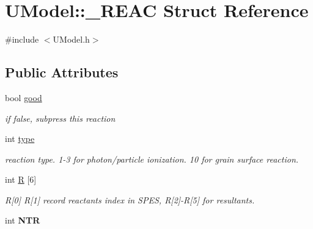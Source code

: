 \hypertarget{structUModel_1_1__REAC}{}\section{U\+Model\+:\+:\+\_\+\+R\+E\+AC Struct Reference}
\label{structUModel_1_1__REAC}


{\ttfamily \#include $<$U\+Model.\+h$>$}

\subsection*{Public Attributes}
\begin{DoxyCompactItemize}
\item 
\mbox{\label{structUModel_1_1__REAC_ae92bd72d613da4a5b26ef83b43f6a18e}} 
bool \hyperlink{structUModel_1_1__REAC_ae92bd72d613da4a5b26ef83b43f6a18e}{good}
\begin{DoxyCompactList}\small\item\em if false, subpress this reaction \end{DoxyCompactList}\item 
\mbox{\label{structUModel_1_1__REAC_ad3c97fb2110c11ae61a93092cbaaccb5}} 
int \hyperlink{structUModel_1_1__REAC_ad3c97fb2110c11ae61a93092cbaaccb5}{type}
\begin{DoxyCompactList}\small\item\em reaction type. 1-\/3 for photon/particle ionization. 10 for grain surface reaction. \end{DoxyCompactList}\item 
\mbox{\label{structUModel_1_1__REAC_a56e0cd68727bc98da5cb86efb70312ef}} 
int \hyperlink{structUModel_1_1__REAC_a56e0cd68727bc98da5cb86efb70312ef}{R} \mbox{[}6\mbox{]}
\begin{DoxyCompactList}\small\item\em R\mbox{[}0\mbox{]} R\mbox{[}1\mbox{]} record reactants index in S\+P\+ES, R\mbox{[}2\mbox{]}-\/R\mbox{[}5\mbox{]} for resultants. \end{DoxyCompactList}\item 
\mbox{\label{structUModel_1_1__REAC_a439bbb6b90bf674559f71fd1b6369018}} 
int {\bfseries N\+TR}
\item 

\end{DoxyCompactItemize}

